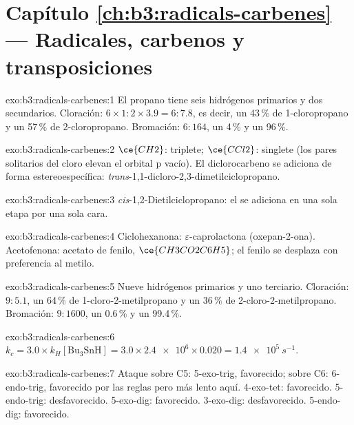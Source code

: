 \section*{Capítulo \ref{ch:b3:radicals-carbenes} --- Radicales, carbenos y transposiciones}

\begin{solution}{exo:b3:radicals-carbenes:1}
El propano tiene seis hidrógenos primarios y dos secundarios. Cloración: $6 \times 1 : 2 \times 3.9 = 6 : 7.8$,
es decir, un 43\,\% de 1-cloropropano y un 57\,\% de 2-cloropropano. Bromación: $6 : 164$, un 4\,\% y un
96\,\%.
\end{solution}

\begin{solution}{exo:b3:radicals-carbenes:2}
$\ce{CH2}$: triplete; $\ce{CCl2}$: singlete (los pares solitarios del cloro elevan el orbital p vacío).
El diclorocarbeno se adiciona de forma estereoespecífica: \textit{trans}-1,1-dicloro-2,3-dimetilciclopropano.
\end{solution}

\begin{solution}{exo:b3:radicals-carbenes:3}
\textit{cis}-1,2-Dietilciclopropano: el  se adiciona en una sola etapa por una sola cara.
\end{solution}

\begin{solution}{exo:b3:radicals-carbenes:4}
Ciclohexanona: $\varepsilon$-caprolactona (oxepan-2-ona). Acetofenona: acetato de fenilo,
$\ce{CH3CO2C6H5}$; el fenilo se desplaza con preferencia al metilo.
\end{solution}

\begin{solution}{exo:b3:radicals-carbenes:5}
Nueve hidrógenos primarios y uno terciario. Cloración: $9 : 5.1$, un 64\,\% de 1-cloro-2-metilpropano
y un 36\,\% de 2-cloro-2-metilpropano. Bromación: $9 : 1600$, un 0.6\,\% y un 99.4\,\%.
\end{solution}

\begin{solution}{exo:b3:radicals-carbenes:6}
$k_c = 3.0 \times k_H[\mathrm{Bu_3SnH}] = 3.0 \times \num{2.4e6} \times 0.020 = \qty{1.4e5}{s^{-1}}$.
\end{solution}

\begin{solution}{exo:b3:radicals-carbenes:7}
Ataque sobre C5: 5-exo-trig, favorecido; sobre C6: 6-endo-trig, favorecido por las reglas pero
más lento aquí. 4-exo-tet: favorecido. 5-endo-trig: desfavorecido. 5-exo-dig: favorecido.
3-exo-dig: desfavorecido. 5-endo-dig: favorecido.
\end{solution}

